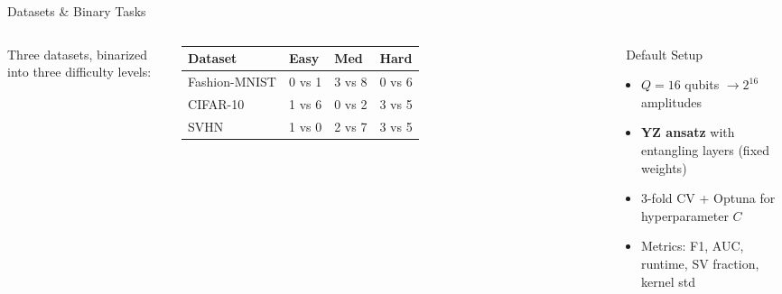 \documentclass[10pt, aspectratio=169]{beamer}
\begin{document}
\begin{frame}{Datasets \& Binary Tasks}
    \begin{columns}[T,onlytextwidth]
        Three datasets, binarized into three difficulty levels:
        \vspace{0.3cm}

        \small
        \begin{tabular}{llll}
            \toprule
            \textbf{Dataset} & \textbf{Easy} & \textbf{Med} & \textbf{Hard} \\
            \midrule
            Fashion-MNIST & 0 vs 1 & 3 vs 8 & 0 vs 6 \\
            CIFAR-10      & 1 vs 6 & 0 vs 2 & 3 vs 5 \\
            SVHN          & 1 vs 0 & 2 vs 7 & 3 vs 5 \\
            \bottomrule
        \end{tabular}
        \begin{block}{\faFlask\ Default Setup}
            \begin{itemize}
                \item $Q = 16$ qubits $\to 2^{16}$ amplitudes
                \item \textbf{YZ ansatz} with entangling layers (fixed weights)
                \item 3-fold CV + Optuna for hyperparameter $C$
                \item Metrics: F1, AUC, runtime, SV fraction, kernel std
            \end{itemize}
        \end{block}
    \end{columns}
\end{frame}
\end{document}
